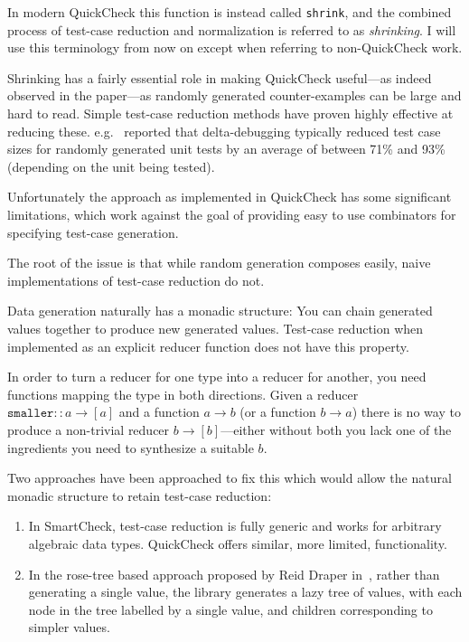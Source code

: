In modern QuickCheck this function is instead called \texttt{shrink},
and the combined process of test-case reduction and normalization is referred to as \emph{shrinking}.
I will use this terminology from now on except when referring to non-QuickCheck work.

Shrinking has a fairly essential role in making QuickCheck useful---as indeed observed in the paper---as randomly generated counter-examples can be large and hard to read.
Simple test-case reduction methods have proven highly effective at reducing these.
e.g.~ \cite{DBLP:conf/issre/LeiA05} reported that delta-debugging typically reduced test case sizes for randomly generated unit tests by an average of between 71\% and 93\% (depending on the unit being tested). 

Unfortunately the approach as implemented in QuickCheck has some significant limitations,
which work against the goal of providing easy to use combinators for specifying test-case generation.

The root of the issue is that while random generation composes easily,
naive implementations of test-case reduction do not.

Data generation naturally has a monadic structure:
You can chain generated values together to produce new generated values.
Test-case reduction when implemented as an explicit reducer function does not have this property.

In order to turn a reducer for one type into a reducer for another,
you need functions mapping the type in both directions.
Given a reducer \(\texttt{smaller} :: a \to [a]\) and a function \(a \to b\) (or a function \(b \to a\)) there is no way to produce a non-trivial reducer \(b \to [b]\)---either
without both you lack one of the ingredients you need to synthesize a suitable \(b\).

Two approaches have been approached to fix this which would allow the natural monadic structure to retain test-case reduction:

\begin{enumerate}
\item In SmartCheck\cite{DBLP:conf/haskell/Pike14},
test-case reduction is fully generic and works for arbitrary algebraic data types.
QuickCheck offers similar,
more limited,
functionality.
\item In the rose-tree based approach proposed by Reid Draper in~\cite{FreeShrinking},
rather than generating a single value,
the library generates a lazy tree of values,
with each node in the tree labelled by a single value,
and children corresponding to simpler values.
\end{enumerate}

